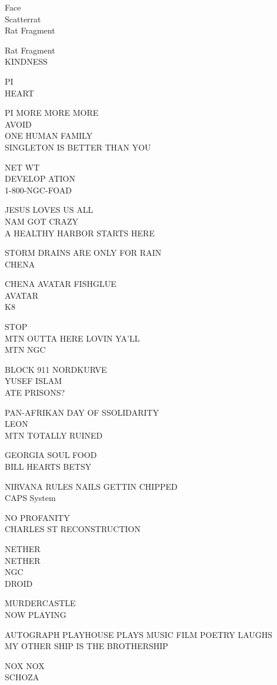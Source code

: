 \documentclass[10pt,letterpaper]{article}
\begin{document}
Face\\
Scatterrat\\
Rat Fragment

Rat Fragment\\
KINDNESS

PI\\
HEART

PI MORE MORE MORE\\
AVOID\\
ONE HUMAN FAMILY\\
SINGLETON IS BETTER THAN YOU

NET WT\\
DEVELOP ATION\\
1{-}800{-}NGC{-}FOAD

JESUS LOVES US ALL\\
NAM GOT CRAZY\\
A HEALTHY HARBOR STARTS HERE

STORM DRAINS ARE ONLY FOR RAIN\\
CHENA

CHENA AVATAR FISHGLUE\\
AVATAR\\
K8

STOP\\
MTN OUTTA HERE LOVIN YA'LL\\
MTN NGC

BLOCK 911 NORDKURVE\\
YUSEF ISLAM\\
ATE PRISONS?

PAN{-}AFRIKAN DAY OF SSOLIDARITY\\
LEON\\
MTN TOTALLY RUINED

GEORGIA SOUL FOOD\\
BILL HEARTS BETSY

NIRVANA RULES NAILS GETTIN CHIPPED\\
CAPS System

NO PROFANITY\\
CHARLES ST RECONSTRUCTION

NETHER\\
NETHER\\
NGC\\
DROID

MURDERCASTLE\\
NOW PLAYING

AUTOGRAPH PLAYHOUSE PLAYS MUSIC FILM POETRY LAUGHS\\
MY OTHER SHIP IS THE BROTHERSHIP

NOX NOX\\
SCHOZA
\end{document}
